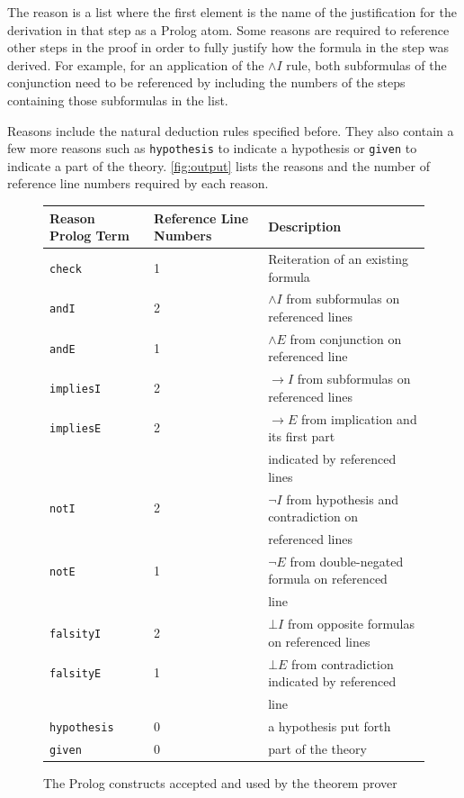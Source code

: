 \documentclass[11pt,twoside,a4paper]{report}
\begin{document}
The reason is a list where the first element is the name of the justification for the derivation in that step as a Prolog atom. Some reasons are required to reference other steps in the proof in order to fully justify how the formula in the step was derived. For example, for an application of the $\wedge I$ rule, both subformulas of the conjunction need to be referenced by including the numbers of the steps containing those subformulas in the list.

Reasons include the natural deduction rules specified before. They also contain a few more reasons such as \lstinline$hypothesis$ to indicate a hypothesis or \lstinline$given$ to indicate a part of the theory. \autoref{fig:output} lists the reasons and the number of reference line numbers required by each reason.

\begin{figure}[tph]
\begin{center}
\begin{tabular}{|l|l|l|}
\hline
Reason Prolog Term & Reference Line Numbers & Description\\
\hline
\lstinline$check$ & 1 & Reiteration of an existing formula\\
\hline
\lstinline$andI$ & 2 & $\wedge I$ from subformulas on referenced lines\\
\hline
\lstinline$andE$ & 1 & $\wedge E$ from conjunction on referenced line\\
\hline
\lstinline$impliesI$ & 2 & $\rightarrow I$ from subformulas on referenced lines\\
\hline
\lstinline$impliesE$ & 2 & $\rightarrow E$ from implication and its first part\\
&& indicated by referenced lines\\
\hline
\lstinline$notI$ & 2 & $\neg I$ from hypothesis and contradiction on \\
&& referenced lines\\
\hline
\lstinline$notE$ & 1 & $\neg E$ from double-negated formula on referenced\\
&& line\\
\hline
\lstinline$falsityI$ & 2 & $\bot I$ from opposite formulas on referenced lines\\
\hline
\lstinline$falsityE$ & 1 & $\bot E$ from contradiction indicated by referenced\\
&& line\\
\hline
\lstinline$hypothesis$ & 0 & a hypothesis put forth\\
\hline
\lstinline$given$ & 0 & part of the theory\\
\hline
\end{tabular}
\end{center}
\caption{The Prolog constructs accepted and used by the theorem prover\label{fig:output}}
\end{figure}
\end{document}
